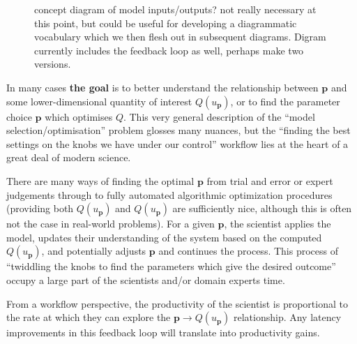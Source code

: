 \documentclass[a4paper,fontsize=12pt]{scrartcl}
\begin{document}
\begin{figure}[h!]
\centering

\caption{concept diagram of model inputs/outputs? not really
  necessary at this point, but could be useful for developing a
  diagrammatic vocabulary which we then flesh out in subsequent
  diagrams. Digram currently includes the feedback loop as well, 
  perhaps make two versions.}
\end{figure}

In many cases \textbf{the goal} is to better understand the
relationship between $\mathbf{p}$ and some lower-dimensional
quantity of interest $Q(u_{\mathbf{p}})$, or to find the
parameter choice $\mathbf{p}$ which optimises $Q$. %
This very general description of the ``model
selection/optimisation'' problem glosses many nuances, but the
``finding the best settings on the knobs we have under our control''
workflow lies at the heart of a great deal of modern science.

There are many ways of finding the optimal $\mathbf{p}$ from trial and
error or expert judgements through to fully automated algorithmic
optimization procedures (providing both $Q(u_{\mathbf{p}})$ and
$Q(u_{\mathbf{p}})$ are sufficiently nice, although this is often not
the case in real-world problems). For a given $\mathbf{p}$, the
scientist applies the model, updates their understanding of the system
based on the computed $Q(u_{\mathbf{p}})$, and potentially adjusts
$\mathbf{p}$ and continues the process. This process of ``twiddling
the knobs to find the parameters which give the desired outcome''
occupy a large part of the scientists and/or domain experts time.

From a workflow perspective, the productivity of the scientist is
proportional to the rate at which they can explore the
$\mathbf{p} \rightarrow Q(u_{\mathbf{p}})$ relationship. Any latency
improvements in this feedback loop will translate into
productivity gains.

\end{document}
